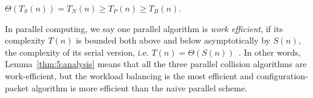 \begin{lemma}
\label{thm:5:analysis}
$\Theta(T_S(n)) = T_N(n) \geq T_P(n) \geq T_B(n)$.
\end{lemma}

\begin{remark} In parallel computing, we say one parallel algorithm is \emph{work efficient}, if its complexity $T(n)$ is bounded both above and below asymptotically by $S(n)$, the complexity of its serial version, i.e. $T(n) = \Theta(S(n))$~\cite{Joesphbook}. In other words, Lemma~\ref{thm:5:analysis} means that all the three parallel collision algorithms are work-efficient, but the workload balancing is the most efficient and configuration-packet algorithm is more efficient than the naive parallel scheme.
\end{remark}

